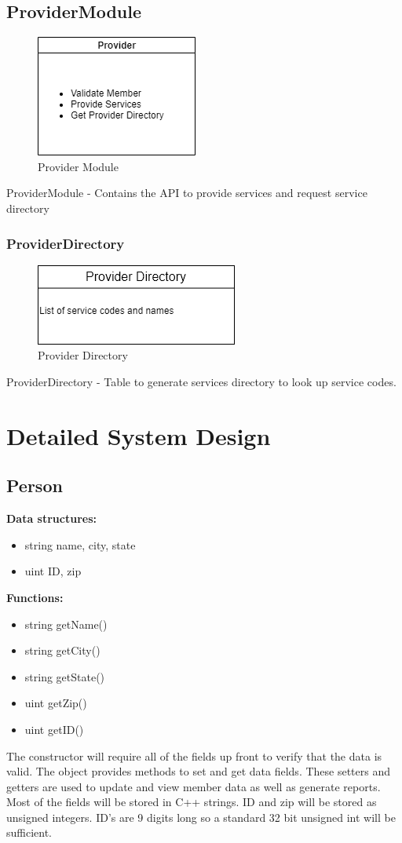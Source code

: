 \documentclass{article}
\begin{document}
\subsection{ProviderModule}
  \begin{figure}[h!]
	\centering
	\includegraphics[width=0.3\linewidth]{providerModule.png}
	\caption[Provider Module]{Provider Module}
	\label{fig:P1compileP0-1}
  \end{figure}
ProviderModule - Contains the API to provide services and request service directory

\pagebreak

\subsubsection{ProviderDirectory}
  \begin{figure}[h!]
	\centering
	\includegraphics[width=0.3\linewidth]{providerDirectory.png}
	\caption[Provider Directory]{Provider Directory}
	\label{fig:P1compileP0-1}
  \end{figure}
ProviderDirectory - Table to generate services directory to look up service codes.

\section{Detailed System Design}
\subsection{Person}
\textbf{Data structures:}
\begin{itemize}
   \item string name, city, state
   \item uint ID, zip
\end{itemize}
\textbf{Functions:}
\begin{itemize}
   \item string getName()
   \item string getCity()
   \item string getState()
   \item uint getZip()
   \item uint getID()
\end{itemize}
The constructor will require all of the fields up front to verify that the data is valid. The object provides methods to set and get data fields. These setters and getters are used to update and view member data as well as generate reports. Most of the fields will be stored in C++ strings. ID and zip will be stored as unsigned integers. ID’s are 9 digits long so a standard 32 bit unsigned int will be sufficient.
\end{document}
